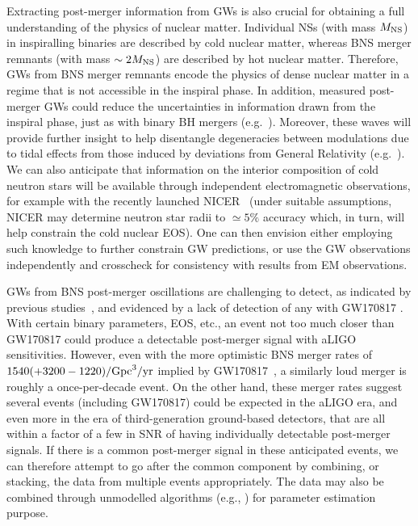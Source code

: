 \documentclass[prd,aps,floatfix,superscriptaddress,nofootinbib,twocolumn,10pt,English]{revtex4-1}
\begin{document}
{Extracting post-merger information from GWs is also crucial for obtaining
a full understanding of the physics of nuclear matter.
Individual NSs (with mass $M_{\rm NS}$) in inspiralling
binaries are described by cold nuclear matter, whereas BNS merger
remnants (with mass $\sim 2M_{\rm NS}$) are described by hot nuclear
matter. Therefore, GWs from BNS merger remnants encode the physics of
dense nuclear matter in a regime that is not accessible in the inspiral
phase. In addition, measured post-merger GWs could reduce the uncertainties in 
information drawn from the inspiral phase, just as with
binary BH mergers
(e.g.~\cite{TheLIGOScientific:2016wfe,TheLIGOScientific:2016src}).
Moreover, these waves will provide further insight to help disentangle
degeneracies between modulations due to tidal effects from
those induced by deviations from General Relativity
(e.g.~\cite{Sampson:2014qqa,ST1,Shibata:2013pra,Palenzuela:2013hsa}).}
We can also anticipate that information on the interior composition of cold neutron stars will
be available through independent electromagnetic observations, for example with the
recently launched NICER~\cite{doi:10.1117/12.2231304} (under suitable
assumptions, NICER may determine neutron star radii to $\simeq 5\%$
accuracy which, in turn, will help constrain the cold nuclear
EOS). One can then envision either employing such knowledge to further
constrain GW predictions, or use the GW observations independently 
and crosscheck for consistency with results from EM observations.

GWs from BNS post-merger oscillations are challenging to detect, as
indicated by previous studies~\cite{Clark:2014wua,clark2016observing},
and evidenced by a lack of detection of any with GW170817 \cite{abbott2017search}. With
certain binary parameters, EOS, etc., an event not too much closer
than GW170817 could produce a detectable post-merger signal with aLIGO
sensitivities. However, even with the more optimistic BNS merger rates
of $1540 (+3200 -1220) /{\rm Gpc}^3/{\rm yr}$ implied by
GW170817~\cite{TheLIGOScientific:2017qsa}, a similarly loud merger is
roughly a once-per-decade event.  On the other hand, these merger
rates suggest several events (including GW170817) could be expected in
the aLIGO era, and even more in the era of third-generation
ground-based detectors, that are all within a factor of a few in SNR of
having individually detectable post-merger signals.
If there is a common post-merger signal in these anticipated events,
we can therefore attempt to go after the common component by combining,
or stacking, the data from multiple events appropriately. The data may also be combined 
through unmodelled algorithms (e.g., \cite{chatziioannou2017inferring}) for parameter estimation purpose.
\end{document}
